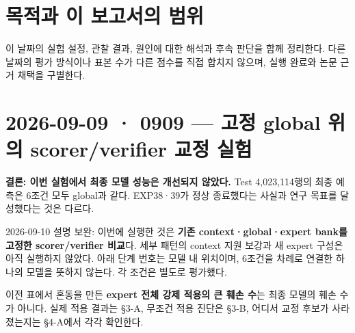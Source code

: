 




\section*{목적과 이 보고서의 범위}

이 날짜의 실험 설정, 관찰 결과, 원인에 대한 해석과 후속 판단을 함께 정리한다. 다른 날짜의 평가 방식이나 표본 수가 다른 점수를 직접 합치지 않으며, 실행 완료와 논문 근거 채택을 구별한다.


\section{2026-09-09 · 0909 — 고정 global 위의 scorer/\allowbreak{}verifier 교정 실험}
\label{report:20260909_0909}
\textbf{결론: 이번 실험에서 최종 모델 성능은 개선되지 않았다.} Test 4,023,114행의 최종 예측은 6조건 모두 global과 같다. EXP38·39가 정상 종료했다는 사실과 연구 목표를 달성했다는 것은 다르다.

2026-09-10 설명 보완: 이번에 실행한 것은 \textbf{기존 context·global·expert bank를 고정한 scorer/\allowbreak{}verifier 비교}다. 세부 패턴의 context 지원 보강과 새 expert 구성은 아직 실행하지 않았다. 아래 단계 번호는 모델 내 위치이며, 6조건을 차례로 연결한 하나의 모델을 뜻하지 않는다. 각 조건은 별도로 평가했다.

이전 표에서 혼동을 만든 \textbf{expert 전체 강제 적용의 큰 훼손 수}는 최종 모델의 훼손 수가 아니다. 실제 적용 결과는 §3-A, 무조건 적용 진단은 §3-B, 어디서 교정 후보가 사라졌는지는 §4-A에서 각각 확인한다.

